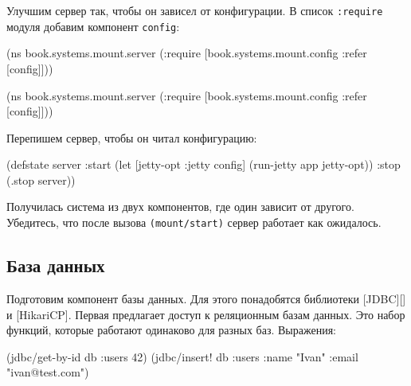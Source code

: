 
Улучшим сервер так, чтобы он зависел от конфигурации. В список \verb|:require|
модуля добавим компонент \verb|config|:

\ifnarrow

\begin{english}
  \begin{clojure}
(ns book.systems.mount.server
 (:require
  [book.systems.mount.config
   :refer [config]]))
  \end{clojure}
\end{english}

\else

\begin{english}
  \begin{clojure}
(ns book.systems.mount.server
 (:require
  [book.systems.mount.config :refer [config]]))
  \end{clojure}
\end{english}

\fi

\noindent
Перепишем сервер, чтобы он читал конфигурацию:

\begin{english}
  \begin{clojure}
(defstate server
  :start
  (let [{jetty-opt :jetty} config]
    (run-jetty app jetty-opt))
  :stop
  (.stop server))
  \end{clojure}
\end{english}

Получилась система из двух компонентов, где один зависит от другого. Убедитесь,
что после вызова \verb|(mount/start)| сервер работает как ожидалось.

\subsection{База данных}


\ifafive
\setlength{\marginparoffset}{-20mm}
\fi

Подготовим компонент базы данных. Для этого понадобятся библиотеки
[JDBC][\marginparoffset] и
[HikariCP].
Первая предлагает доступ к реляционным базам данных. Это набор функций, которые
работают одинаково для разных баз. Выражения:

\begin{english}
  \begin{clojure}
(jdbc/get-by-id db :users 42)
(jdbc/insert! db :users
   {:name "Ivan" :email "ivan@test.com"})
  \end{clojure}
\end{english}

